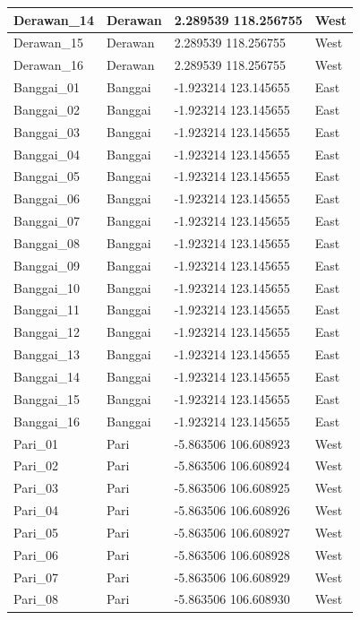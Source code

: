 \documentclass[
]{article}
\begin{document}
\begin{table}
\begin{tabular}{l|l|l|l}
\hline
Derawan\_14 & Derawan & 2.289539 118.256755 & West\\
\hline
Derawan\_15 & Derawan & 2.289539 118.256755 & West\\
\hline
Derawan\_16 & Derawan & 2.289539 118.256755 & West\\
\hline
Banggai\_01 & Banggai & -1.923214 123.145655 & East\\
\hline
Banggai\_02 & Banggai & -1.923214 123.145655 & East\\
\hline
Banggai\_03 & Banggai & -1.923214 123.145655 & East\\
\hline
Banggai\_04 & Banggai & -1.923214 123.145655 & East\\
\hline
Banggai\_05 & Banggai & -1.923214 123.145655 & East\\
\hline
Banggai\_06 & Banggai & -1.923214 123.145655 & East\\
\hline
Banggai\_07 & Banggai & -1.923214 123.145655 & East\\
\hline
Banggai\_08 & Banggai & -1.923214 123.145655 & East\\
\hline
Banggai\_09 & Banggai & -1.923214 123.145655 & East\\
\hline
Banggai\_10 & Banggai & -1.923214 123.145655 & East\\
\hline
Banggai\_11 & Banggai & -1.923214 123.145655 & East\\
\hline
Banggai\_12 & Banggai & -1.923214 123.145655 & East\\
\hline
Banggai\_13 & Banggai & -1.923214 123.145655 & East\\
\hline
Banggai\_14 & Banggai & -1.923214 123.145655 & East\\
\hline
Banggai\_15 & Banggai & -1.923214 123.145655 & East\\
\hline
Banggai\_16 & Banggai & -1.923214 123.145655 & East\\
\hline
Pari\_01 & Pari & -5.863506 106.608923 & West\\
\hline
Pari\_02 & Pari & -5.863506 106.608924 & West\\
\hline
Pari\_03 & Pari & -5.863506 106.608925 & West\\
\hline
Pari\_04 & Pari & -5.863506 106.608926 & West\\
\hline
Pari\_05 & Pari & -5.863506 106.608927 & West\\
\hline
Pari\_06 & Pari & -5.863506 106.608928 & West\\
\hline
Pari\_07 & Pari & -5.863506 106.608929 & West\\
\hline
Pari\_08 & Pari & -5.863506 106.608930 & West\\

\end{tabular}
\end{table}
\end{document}
